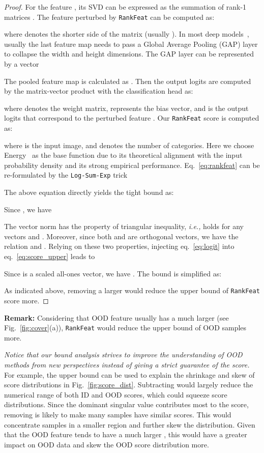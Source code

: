 \begin{proof}

For the feature , its SVD   can be expressed as the summation of rank-1 matrices . The feature perturbed by \texttt{RankFeat} can be computed as:

where  denotes the shorter side of the matrix (usually ). In most deep models~\cite{he2016deep,he2016identity}, usually the last feature map needs to pass a Global Average Pooling (GAP) layer to collapse the width and height dimensions. The GAP layer can be represented by a vector

The pooled feature map is calculated as . Then the output logits are computed by the matrix-vector product with the classification head as:

where  denotes the weight matrix,  represents the bias vector, and  is the output logits that correspond to the perturbed feature . Our \texttt{RankFeat} score is computed as:

where  is the input image, and  denotes the number of categories. Here we choose Energy~\cite{liu2020energy} as the base function due to its theoretical alignment with the input probability density and its strong empirical performance. Eq.~\eqref{eq:rankfeat} can be re-formulated by the \texttt{Log-Sum-Exp} trick

The above equation directly yields the tight bound as:

Since , we have

The vector norm has the property of triangular inequality, \emph{i.e.,}  holds for any vectors  and . Moreover, since both  and  are orthogonal vectors, we have the relation  and .
Relying on these two properties, injecting eq.~\eqref{eq:logit} into eq.~\eqref{eq:score_upper} leads to

Since  is a scaled all-ones vector, we have . The bound is simplified as:

As indicated above, removing a larger  would reduce the upper bound of \texttt{RankFeat} score more.
\end{proof}



\noindent\textbf{Remark:} Considering that OOD feature usually has a much larger  (see Fig.~\ref{fig:cover}(a)), \texttt{RankFeat} would reduce the upper bound of OOD samples more. 

\emph{Notice that our bound analysis strives to improve the understanding of OOD methods from new perspectives instead of giving a strict guarantee of the score.} For example, the upper bound can be used to explain the shrinkage and skew of score distributions in Fig.~\ref{fig:score_dist}. Subtracting  would largely reduce the numerical range of both ID and OOD scores, which could squeeze score distributions. Since the dominant singular value  contributes most to the score, removing  is likely to make many samples have similar scores. This would concentrate samples in a smaller region and further skew the distribution. Given that the OOD feature tends to have a much larger , this would have a greater impact on OOD data and skew the OOD score distribution more.

